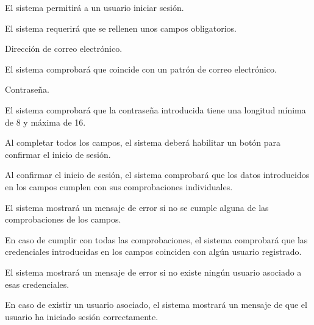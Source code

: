 \begin{enumitem}[label=\bfseries{RIni \arabic*.},leftmargin=*]
	\item El sistema permitirá a un usuario iniciar sesión.
	\begin{enumitem}[label*=\bfseries{\arabic*.}]
		\item El sistema requerirá que se rellenen unos campos obligatorios.
		\begin{enumitem}[label*=\bfseries{\arabic*.}]
			\item Dirección de correo electrónico.
			\begin{enumitem}[label*=\bfseries{\arabic*.}]
				\item El sistema comprobará que coincide con un patrón de correo electrónico.
			\end{enumitem}
			\item Contraseña.
			\begin{enumitem}[label*=\bfseries{\arabic*.}]
				\item El sistema comprobará que la contraseña introducida tiene una longitud mínima de 8 y máxima de 16.
			\end{enumitem}
		\end{enumitem}
		\item Al completar todos los campos, el sistema deberá habilitar un botón para confirmar el inicio de sesión.
		\begin{enumitem}[label*=\bfseries{\arabic*.}]
			\item Al confirmar el inicio de sesión, el sistema comprobará que los datos introducidos en los campos cumplen con sus comprobaciones individuales.
			\begin{enumitem}[label*=\bfseries{\arabic*.}]
				\item El sistema mostrará un mensaje de error si no se cumple alguna de las comprobaciones de los campos.
				\item En caso de cumplir con todas las comprobaciones, el sistema comprobará que las credenciales introducidas en los campos coinciden con algún usuario registrado.
				\begin{enumitem}[label*=\bfseries{\arabic*.}]
					\item El sistema mostrará un mensaje de error si no existe ningún usuario asociado a esas credenciales.
					\item En caso de existir un usuario asociado, el sistema mostrará un mensaje de que el usuario ha iniciado sesión correctamente.
				\end{enumitem}
			\end{enumitem}
		\end{enumitem}
	\end{enumitem}
\end{enumitem}
